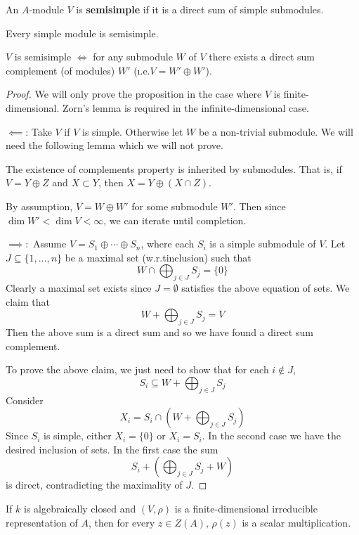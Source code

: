 \begin{defn}
	An $A$-module $V$ is \textbf{semisimple} if it is a direct sum of simple submodules.
\end{defn}

\begin{rmk}
	Every simple module is semisimple.
\end{rmk}

\begin{prop}
	$V$ is semisimple $\iff$ for any submodule $W$ of $V$ there exists a direct sum complement (of modules) $W'$ (\i.e.\@ $V = W' \oplus W'$).
\end{prop}

\begin{proof}
	We will only prove the proposition in the case where $V$ is finite-dimensional.
	Zorn's lemma is required in the infinite-dimensional case.
	
	$\impliedby$: Take $V$ if $V$ is simple.
	Otherwise let $W$ be a non-trivial submodule.
	We will need the following lemma which we will not prove.
	\begin{lem}
		The existence of complements property is inherited by submodules.
		That is, if $V = Y \oplus Z$ and $X \subset Y$, then $X = Y \oplus (X \cap Z)$.
	\end{lem}	
	By assumption, $V = W \oplus W'$ for some submodule $W'$.
	Then since $\dim W' < \dim V < \infty$, we can iterate until completion.
	
	$\implies:$
	Assume $V = S_1 \oplus \cdots \oplus S_n$, where each $S_i$ is a simple submodule of $V$.
	Let $J \subseteq \{1,\ldots,n\}$ be a maximal set (w.r.t\@ inclusion) such that
	\[W \cap \bigoplus_{j \in J} S_j = \{0\}\]
	Clearly a maximal set exists since $J = \emptyset$ satisfies the above equation of sets.
	We claim that 
	\[W + \bigoplus_{j \in J} S_j = V\]
	Then the above sum is a direct sum and so we have found a direct sum complement.
	
	To prove the above claim, we just need to show that for each $i \notin J$,
	\[S_i \subseteq W + \bigoplus_{j \in J} S_j\]
	Consider
	\[X_i = S_i \cap \left( W + \bigoplus_{j \in J} S_j \right)\]
	Since $S_i$ is simple, either $X_i = \{0\}$ or $X_i = S_i$.
	In the second case we have the desired inclusion of sets.
	In the first case the sum
	\[S_i + \left( \bigoplus_{j \in J} S_j + W \right)\]
	is direct, contradicting the maximality of $J$.
\end{proof}

\begin{cor}\label{cor:schur}
	If $k$ is algebraically closed and $(V,\rho)$ is a finite-dimensional irreducible representation of $A$, then for every $z \in Z(A)$, $\rho(z)$ is a scalar multiplication.
\end{cor}

